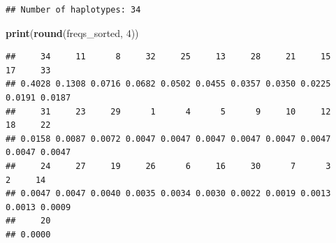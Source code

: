 \documentclass[
]{article}
\newenvironment{Shaded}{\begin{snugshade}}{\end{snugshade}}
\newcommand{\AttributeTok}[1]{\textcolor[rgb]{0.13,0.29,0.53}{#1}}
\newcommand{\ConstantTok}[1]{\textcolor[rgb]{0.56,0.35,0.01}{#1}}
\newcommand{\ControlFlowTok}[1]{\textcolor[rgb]{0.13,0.29,0.53}{\textbf{#1}}}
\newcommand{\DecValTok}[1]{\textcolor[rgb]{0.00,0.00,0.81}{#1}}
\newcommand{\FunctionTok}[1]{\textcolor[rgb]{0.13,0.29,0.53}{\textbf{#1}}}
\newcommand{\NormalTok}[1]{#1}
\newcommand{\OtherTok}[1]{\textcolor[rgb]{0.56,0.35,0.01}{#1}}
\newcommand{\SpecialCharTok}[1]{\textcolor[rgb]{0.81,0.36,0.00}{\textbf{#1}}}
\newcommand{\StringTok}[1]{\textcolor[rgb]{0.31,0.60,0.02}{#1}}
\begin{document}
\begin{Shaded}
\end{Shaded}

\begin{verbatim}
## Number of haplotypes: 34
\end{verbatim}

\begin{Shaded}
\begin{Highlighting}[]
\FunctionTok{print}\NormalTok{(}\FunctionTok{round}\NormalTok{(freqs\_sorted, }\DecValTok{4}\NormalTok{))}
\end{Highlighting}
\end{Shaded}

\begin{verbatim}
##     34     11      8     32     25     13     28     21     15     17     33 
## 0.4028 0.1308 0.0716 0.0682 0.0502 0.0455 0.0357 0.0350 0.0225 0.0191 0.0187 
##     31     23     29      1      4      5      9     10     12     18     22 
## 0.0158 0.0087 0.0072 0.0047 0.0047 0.0047 0.0047 0.0047 0.0047 0.0047 0.0047 
##     24     27     19     26      6     16     30      7      3      2     14 
## 0.0047 0.0047 0.0040 0.0035 0.0034 0.0030 0.0022 0.0019 0.0013 0.0013 0.0009 
##     20 
## 0.0000
\end{verbatim}
\end{document}
